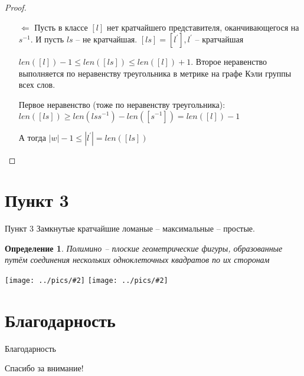 \documentclass[serif, ucs]{beamer}
\newtheorem{Def}{Определение}[section]
\newcommand{\gr}[2]{\texttt{[image: ../pics/\#2]}}
\newcommand{\p}[1]{#1^{\prime}}
\begin{document}
\begin{frame}
\begin{footnotesize}
\begin{proof}
	\begin{itemize}
		\item[$\Leftarrow$] Пусть в классе $[l]$ нет кратчайшего представителя, оканчивающегося на $s^{-1}$. И пусть $ls$ -- не кратчайшая. $[ls] = [\p l], \p l$ -- кратчайшая
		
		$len([l]) - 1 \leqslant len([ls])\leqslant len([l]) + 1$. Второе неравенство выполняется по неравенству треугольника в метрике на графе Кэли группы всех слов.
		
		Первое неравенство (тоже по неравенству треугольника): $len([ls])\geqslant len(lss^{-1}) - len([s^{-1}]) = len([l]) - 1$
		
		А тогда $|w|-1 \leqslant |\p l | = len([ls])$
	\end{itemize}
\end{proof}
\end{footnotesize}
\end{frame}
\section{Пункт 3}
\begin{frame}{Пункт 3}
	Замкнутые кратчайшие ломаные -- максимальные -- простые.
	
	\begin{Def}
	Полимино -- плоские геометрические фигуры, образованные путём соединения нескольких одноклеточных квадратов по их сторонам
\end{Def}

\gr{0.4}{babaBaBAAA}
\gr{0.4}{bbbaBBaBAA}
\end{frame}
\section{Благодарность}
\begin{frame}{Благодарность}
\begin{center}
{\LARGE Спасибо за внимание!}
\end{center}
\end{frame}
\end{document}
